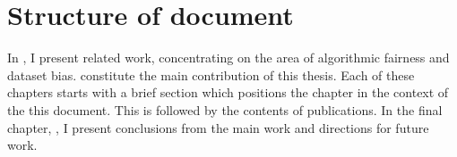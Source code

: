\section{Structure of document}%
\label{sec:thesis-structure}
In , I present related work,
concentrating on the area of algorithmic fairness and dataset bias.
 constitute the main contribution of this thesis.
Each of these chapters starts with a brief section which positions the chapter in the context of the this document.
This is followed by the contents of publications.
In the final chapter, , I present conclusions from the main work and directions for future work.
